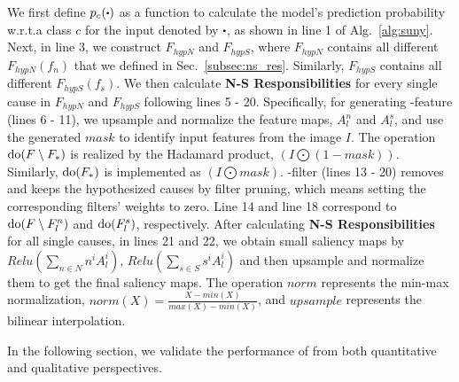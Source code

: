 We first define $p_c(\bigcdot)$ as a function to calculate the model's prediction probability w.r.t.\;a class $c$ for the input denoted by $\bigcdot$, as shown in line 1 of Alg.~\ref{alg:suny}.
Next, in line 3, we construct $F_{hypN}$ and $F_{hypS}$, where $F_{hypN}$ contains all different $F_{hypN}(f_n)$ that we defined in Sec.~\ref{subsec:ns_res}.
Similarly, $F_{hypS}$ contains all different $F_{hypS}(f_s)$.
We then calculate \textbf{N-S Responsibilities} for every single cause in $F_{hypN}$ and $F_{hypS}$ following lines 5 - 20.
Specifically, for generating \name{}-feature (lines 6 - 11), we upsample and normalize the feature maps, $A_l^n$ and $A_l^s$, and use the generated $mask$ to identify input features from the image $I$.
The operation ${\rm do}(F \setminus F_*)$ is realized by the Hadamard product, $(I \bigodot (1 - mask))$.
Similarly, ${\rm do}(F_*)$ is implemented as $(I \bigodot mask)$.
\name{}-filter (lines 13 - 20) removes and keeps the hypothesized causes by filter pruning, which means setting the corresponding filters' weights to zero.
Line 14 and line 18 correspond to ${\rm do}(F \setminus F_l^n)$ and ${\rm do}(F_l^s)$, respectively.
After calculating \textbf{N-S Responsibilities} for all single causes, in lines 21 and 22, we obtain small saliency maps by $Relu(\sum_{n \in N} n^{i}A_l^i)$, $Relu(\sum_{s \in S} s^{i}A_l^i)$ and then upsample and normalize them to get the final saliency maps.
The operation $norm$ represents the min-max normalization, $norm(X) = \frac{X - min(X)}{max(X) - min(X)}$, and $upsample$ represents the bilinear interpolation.

In the following section, we validate the performance of \name{} from both quantitative and qualitative perspectives.
